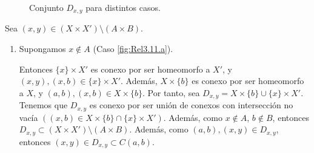 \begin{ejercicio}
\begin{figure}[H]
\begin{comment}
                \draw[-stealth] (-0.5, 0) -- (5, 0) node[right] {$X$};
                \draw[-stealth] (0, -0.5) -- (0, 4.3) node[above] {$X'$};
    
                \draw[ultra thick, teal] (1.5,0.1) -- (1.5,-0.1);
                \draw[ultra thick, teal] (3.5,0.1) -- (3.5,-0.1);
                \draw[decorate,decoration={brace,amplitude=5pt,mirror}, teal, yshift=-5pt]
                (1.5,0) -- (3.5,0) node[midway,below] {$A$};
    
                \draw[ultra thick, blue] (0.1,1.5) -- (-0.1,1.5);
                \draw[ultra thick, blue] (0.1,3) -- (-0.1,3);
                \draw[decorate,decoration={brace,amplitude=5pt}, blue, xshift=-5pt]
                (0,1.5) -- (0,3) node[midway,left] {$B$};
                
                \draw[fill=gray, ultra thick] (1.5,1.5) rectangle (3.5,3);
                \node[white] at (2.5,2.25) {$A\times B$};
    
                \fill (\a,\b) circle (0.075);
                \node[above] at (\a,\b) {$(a,b)$};
    
                \fill (\x,\y) circle (0.075);
                \node[above] at (\x,\y) {$(x,y)$};
    
                \draw[red, ultra thick] (\x,\y) -- (\a,\y) -- (\a,\b);
                \node[red, right] at (\a,\y) {$D_{x,y}$};
            \end{tikzpicture}
            \caption{$x\notin A, y\in B$.}
        \end{subfigure}
        \end{comment}
        \caption{Conjunto $D_{x,y}$ para distintos casos.}
    \end{figure}

    Sea $(x,y)\in (X \times X') \setminus (A \times B)$.
    \begin{enumerate}
        \item Supongamos $x\notin A$ (Caso \ref{fig:Rel3.11.a}).
        
        Entonces $\{x\}\times X'$ es conexo por ser 
        homeomorfo a $X'$, y $(x,y),(x,b)\in \{x\}\times X'$.
        Además, $X\times \{b\}$ es conexo por ser homeomorfo a $X$, y $(a,b),(x,b)\in X\times \{b\}$.
        Por tanto, sea $D_{x,y}=X\times \{b\} \cup \{x\}\times X'$.
        Tenemos que $D_{x,y}$ es conexo por ser unión de conexos con intersección
        no vacía $\left((x,b)\in X\times \{b\}\cap \{x\}\times X'\right)$.
        Además, como $x\notin A$, $b\notin B$, entonces $D_{x,y}\subset (X \times X') \setminus (A \times B)$.
        Además, como $(a,b), (x,y)\in D_{x,y}$, entonces $(x,y)\in D_{x,y}\subset C(a,b)$.


\end{enumerate}
\end{ejercicio}

